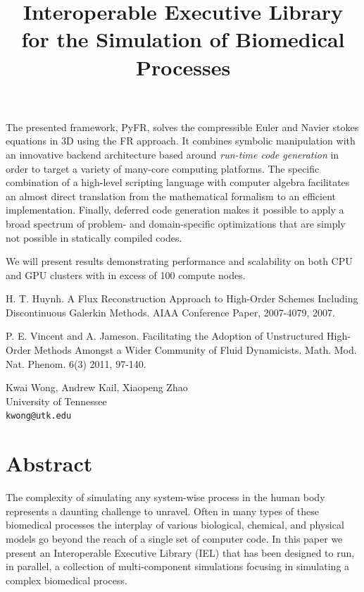 \documentclass[article,A4,11pt]{llncs}%
\begin{document}
The presented framework, PyFR, solves the compressible Euler and Navier stokes equations in 3D using the FR approach. It combines symbolic manipulation with an innovative backend architecture based around \emph{run-time code generation} in order to target a variety of many-core computing platforms. The specific combination of a high-level scripting language with computer algebra facilitates an almost direct translation from the mathematical formalism to an efficient implementation. Finally, deferred code generation makes it possible to apply a broad spectrum of problem- and domain-specific optimizations that are simply not possible in statically compiled codes.

We will present results demonstrating performance and scalability on both CPU and GPU clusters with in excess of 100 compute nodes.



\begin{thebibliography}{10}
{\sc H. T. Huynh}. {A Flux Reconstruction Approach to High-Order Schemes Including Discontinuous Galerkin Methods}. AIAA Conference Paper, 2007-4079, 2007.

{\sc P. E. Vincent and A. Jameson}. {Facilitating the Adoption of Unstructured High-Order Methods Amongst a Wider Community of Fluid Dynamicists}. Math. Mod. Nat. Phenom.  6(3) 2011, 97-140.
\end{thebibliography}

\title{Interoperable Executive Library for the Simulation of Biomedical Processes}
 \author{} \institute{}
\maketitle
\begin{center}
{\large Kwai Wong, Andrew Kail, Xiaopeng  Zhao}\\
University of Tennessee\\
{\tt kwong@utk.edu}
\end{center}

\section*{Abstract}
The complexity of simulating any system-wise process in the human body represents a daunting challenge to unravel. Often in many types of these biomedical processes the interplay of various biological, chemical, and physical models go beyond the reach of a single set of computer code. In this paper we present an Interoperable Executive Library (IEL) that has been designed to run, in parallel, a collection of multi-component simulations focusing in simulating a complex biomedical process. 
 
\end{document}
